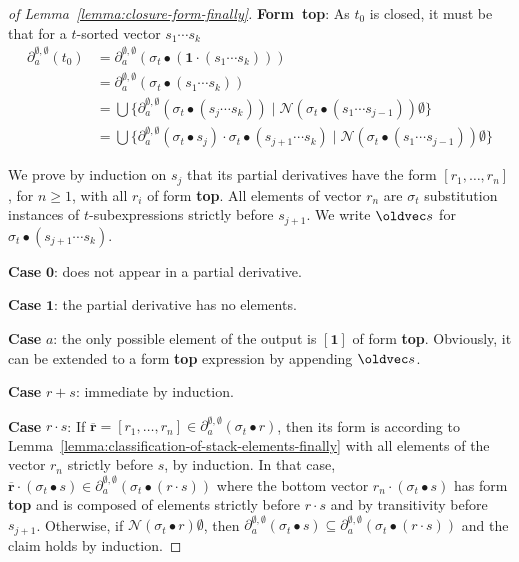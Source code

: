\documentclass[runningheads, envcountsame, a4paper]{llncs}
\let\vec\oldvec
\newcommand\pderiv[3][{}]{\partial^{#1}_{#3}(#2)}
\newcommand\Rnull{\mathbf0}
\newcommand\Rempty{\mathbf1}
\newcommand\Null{\mathcal{N}}
\newcommand\RS{\ensuremath{\overline{\mathbf{r}}}}
\newcommand\ApplySubst[2]{#1 \bullet #2} %
\begin{document}
\begin{proof}[of Lemma~\ref{lemma:closure-form-finally}]
  \textbf{Form~top}:
  As $t_0$ is closed, it must be that for a $t$-sorted vector $s_1\cdots s_k$
  \begin{align*}
    \pderiv[\emptyset,\emptyset]{t_0}a
    &= \pderiv[\emptyset,\emptyset]{\ApplySubst{\sigma_t}{(\Rempty \cdot (s_1\cdots s_k))}}a \\
    &= \pderiv[\emptyset,\emptyset]{\ApplySubst{\sigma_t}{(s_1\cdots
        s_k)}}a \\
    &= \bigcup \{
    \pderiv[\emptyset,\emptyset]{\ApplySubst{\sigma_t} {(s_j \cdots s_k)}}a
    \mid \Null (\ApplySubst{\sigma_t}{(s_1 \cdots s_{j-1})})\emptyset \} \\
    &= \bigcup \{
    \pderiv[\emptyset,\emptyset]{\ApplySubst{\sigma_t}{s_j}}a \cdot \ApplySubst{\sigma_t} {(s_{j+1} \cdots s_k)}
    \mid \Null (\ApplySubst{\sigma_t}{(s_1 \cdots s_{j-1})})\emptyset \}
  \end{align*}

  We prove by induction on $s_j$ that its partial derivatives have the form $[r_1, \dots, r_n]$, for
  $n\ge1$, with all $r_i$ of form \textbf{top}.
  All elements of vector $r_n$ are $\sigma_t$ substitution instances of $t$-subexpressions strictly
  before $s_{j+1}$. We write $\vec s$ for $\ApplySubst{\sigma_t} {(s_{j+1} \cdots s_k)}$.

  \textbf{Case }$\Rnull$: does not appear in a partial derivative.

  \textbf{Case }$\Rempty$: the partial derivative has no elements.

  \textbf{Case }$a$: the only possible element of the output is
  $[\Rempty]$ of form \textbf{top}. Obviously, it can be extended to a
  form \textbf{top} expression by appending $ \vec s$.

  \textbf{Case }$r+s$: immediate by induction.

  \textbf{Case }$r\cdot s$: If $\RS = [r_1,\dots,r_n] \in
  \pderiv[\emptyset,\emptyset]{\ApplySubst{\sigma_t}r}a$, then its
  form is according to
  Lemma~\ref{lemma:classification-of-stack-elements-finally} with all elements
  of the vector $r_n$ strictly before $s$, by induction. In that case, $\RS
  \cdot (\ApplySubst{\sigma_t}s) \in
  \pderiv[\emptyset,\emptyset]{\ApplySubst{\sigma_t}{(r\cdot s)}}a$
  where the bottom vector $r_n \cdot  (\ApplySubst{\sigma_t}s)$ has
  form \textbf{top} and is
  composed of elements strictly before $r\cdot s$ and by transitivity
  before $s_{j+1}$.
  Otherwise, if $\Null (\ApplySubst{\sigma_t}r)\emptyset$, then
  $\pderiv[\emptyset,\emptyset]{\ApplySubst{\sigma_t}s}a \subseteq
  \pderiv[\emptyset,\emptyset]{\ApplySubst{\sigma_t}{(r\cdot s)}}a$
  and the claim holds by induction.


\end{proof}
\end{document}
